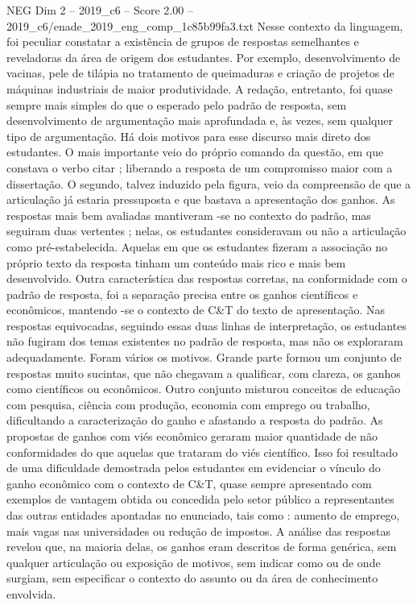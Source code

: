 \begin{textsample}{NEG Dim 2 – 2019\_c6 – Score 2.00 – 2019\_c6/enade\_2019\_eng\_comp\_1c85b99fa3.txt}
Nesse contexto da linguagem, foi peculiar constatar a existência de grupos de respostas semelhantes e reveladoras da área de origem dos estudantes.
Por exemplo, desenvolvimento de vacinas, pele de tilápia no tratamento de queimaduras e criação de projetos de máquinas industriais de maior produtividade.
A redação, entretanto, foi quase sempre mais simples do que o esperado pelo padrão de resposta, sem desenvolvimento de argumentação mais aprofundada e, às vezes, sem qualquer tipo de argumentação.
Há dois motivos para esse discurso mais direto dos estudantes.
O mais importante veio do próprio comando da questão, em que constava o verbo citar ; liberando a resposta de um compromisso maior com a dissertação.
O segundo, talvez induzido pela figura, veio da compreensão de que a articulação já estaria pressuposta e que bastava a apresentação dos ganhos.
As respostas mais bem avaliadas mantiveram -se no contexto do padrão, mas seguiram duas vertentes ; nelas, os estudantes consideravam ou não a articulação como pré-estabelecida.
Aquelas em que os estudantes fizeram a associação no próprio texto da resposta tinham um conteúdo mais rico e mais bem desenvolvido.
Outra característica das respostas corretas, na conformidade com o padrão de resposta, foi a separação precisa entre os ganhos científicos e econômicos, mantendo -se o contexto de C\&T do texto de apresentação.
Nas respostas equivocadas, seguindo essas duas linhas de interpretação, os estudantes não fugiram dos temas existentes no padrão de resposta, mas não os exploraram adequadamente.
Foram vários os motivos.
Grande parte formou um conjunto de respostas muito sucintas, que não chegavam a qualificar, com clareza, os ganhos como científicos ou econômicos.
Outro conjunto misturou conceitos de educação com pesquisa, ciência com produção, economia com emprego ou trabalho, dificultando a caracterização do ganho e afastando a resposta do padrão.
As propostas de ganhos com viés econômico geraram maior quantidade de não conformidades do que aquelas que trataram do viés científico.
Isso foi resultado de uma dificuldade demostrada pelos estudantes em evidenciar o vínculo do ganho econômico com o contexto de C\&T, quase sempre apresentado com exemplos de vantagem obtida ou concedida pelo setor público a representantes das outras entidades apontadas no enunciado, tais como : aumento de emprego, mais vagas nas universidades ou redução de impostos.
A análise das respostas revelou que, na maioria delas, os ganhos eram descritos de forma genérica, sem qualquer articulação ou exposição de motivos, sem indicar como ou de onde surgiam, sem especificar o contexto do assunto ou da área de conhecimento envolvida.

\end{textsample}
